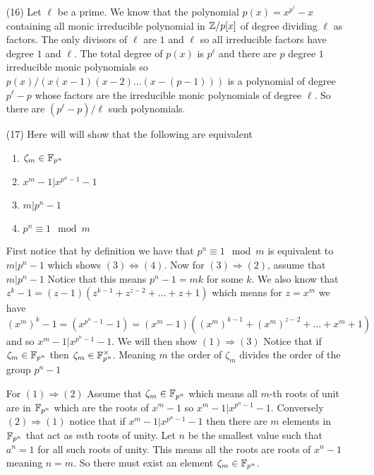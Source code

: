 \documentclass[12pt]{amsart}
\begin{document}
\begin{itemize}
\item[(16)] Let $\ell$ be a prime. We know that the polynomial $p(x)=x^{p^\ell}-x$ containing all monic irreducible polynomial in $\mathbb{Z}/p[x]$ of degree dividing $\ell$ as factors. The only divisors of $\ell$ are $1$ and $\ell$ so all irreducible factors have degree $1$ and $\ell$. The total degree of $p(x)$ is $p^\ell$ and there are $p$ degree $1$ irreducible monic polynomials so $p(x)/(x(x-1)(x-2)\dots(x-(p-1)))$ is a polynomial of degree $p^\ell-p$ whose factors are the irreducible monic polynomials of degree $\ell$. So there are $(p^\ell-p)/\ell$ such polynomials.\\

\item[(17)] Here will will show that the following are equivalent 
\begin{enumerate}
    \item $\zeta_m\in \mathbb{F}_{p^n}$
    \item $x^m-1|x^{p^n-1}-1$
    \item $m|p^n-1$
    \item $p^n\equiv 1\mod m$
\end{enumerate} 

First notice that by definition we have that $p^n\equiv 1 \mod m$ is equivalent to $m|p^n-1$ which shows $(3)\Leftrightarrow (4)$. Now for $(3)\Rightarrow (2)$, assume that $m|p^n-1$ Notice that this means $p^n-1=mk$ for some $k$. We also know that $z^k-1=(z-1)(z^{k-1}+z^{z-2}+\dots+z+1)$ which means for $z=x^m$ we have $(x^m)^k-1=(x^{p^n-1}-1)=(x^m-1)((x^m)^{k-1}+(x^m)^{z-2}+\dots+x^m+1)$ and so $x^m-1|x^{p^n-1}-1$. 
We will then show $(1)\Rightarrow (3)$ Notice that if $\zeta_m\in \mathbb{F}_{p^n}$ then $\zeta_m\in \mathbb{F}_{p^n}^\times$. Meaning $m$ the order of $\zeta_m$ divides the order of the group $p^n-1$

For $(1)\Rightarrow (2)$ Assume that $\zeta_m\in \mathbb{F}_{p^n}$ which means all $m$-th roots of unit are in $\mathbb{F}_{p^n}$ which are the roots of $x^m-1$ so $x^m-1|x^{p^n-1}-1$. Conversely $(2)\Rightarrow (1)$ notice that if $x^m-1|x^{p^n-1}-1$ then there are $m$ elements in $\mathbb{F}_{p^n}$ that act as $m$th roots of unity. Let $n$ be the smallest value such that $a^n=1$ for all such roots of unity. This means all the roots are roots of $x^n-1$ meaning $n=m$. So there must exist an element $\zeta_m\in \mathbb{F}_{p^n}$. 



\end{itemize}
\end{document}
